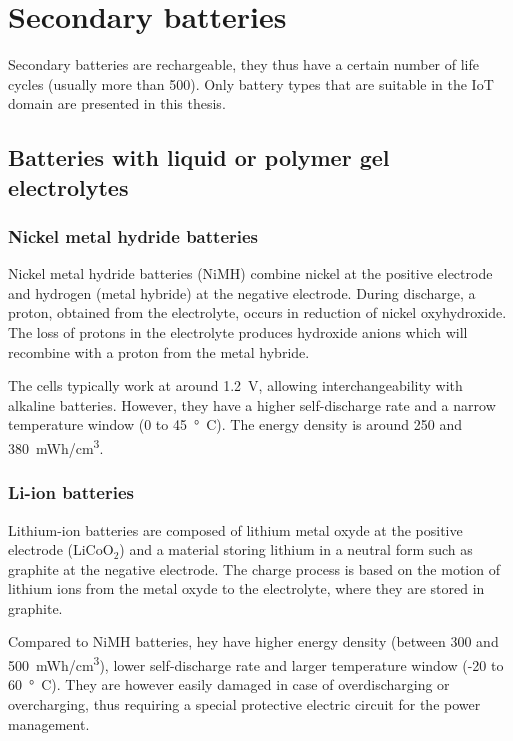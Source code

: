 \documentclass{EPL-master-thesis-covers-EN}
\begin{document}
\section{Secondary batteries}

Secondary batteries are rechargeable, they thus have a certain number of life cycles (usually more than 500). Only battery types that are suitable in the IoT domain are presented in this thesis.

\subsection*{Batteries with liquid or polymer gel electrolytes}


\subsubsection*{Nickel metal hydride batteries}

Nickel metal hydride batteries (NiMH) combine nickel at the positive electrode and hydrogen (metal hybride) at the negative electrode.  During discharge, a proton, obtained from the electrolyte, occurs in reduction of nickel oxyhydroxide. The loss of protons in the electrolyte produces hydroxide anions which will recombine with a proton from the metal hybride.

The cells typically work at around \SI{1.2}{V}, allowing interchangeability with alkaline batteries. However, they have a higher self-discharge rate and a narrow temperature window (0 to \SI{45}{\degree C}). The energy density is around 250 and \SI{380}{mWh/cm^3}.

\subsubsection*{Li-ion batteries}

Lithium-ion batteries are composed of lithium metal oxyde at the positive electrode (LiCoO${}_2$) and a material storing lithium in a neutral form such as graphite at the negative electrode. The charge process is based on the motion of lithium ions from the metal oxyde to the electrolyte, where they are stored in graphite.

Compared to NiMH batteries, hey have higher energy density (between 300 and \SI{500}{mWh/cm^3}), lower self-discharge rate and larger temperature window (-20 to \SI{60}{\degree C}). They are however easily damaged in case of overdischarging or overcharging, thus requiring a special protective electric circuit for the power management.
\end{document}
